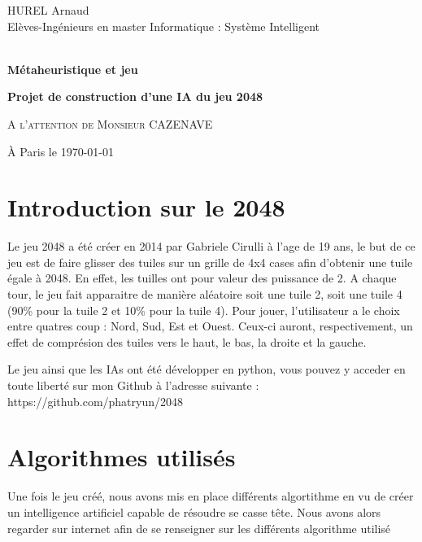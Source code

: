 \documentclass[11pt,a4paper]{article}
\begin{document}
\begin{center}
HUREL Arnaud\\
Elèves-Ingénieurs en master Informatique : Système Intelligent      
\vspace{3cm}



{\textbf{\Huge{\\Métaheuristique et jeu\\}}}
\vspace{1cm}


{\textbf{\Large{Projet de construction d'une IA du jeu 2048\\}}}
\vspace{4cm}

\textsc{{\large{A l'attention de Monsieur CAZENAVE\\}}}


\vspace{4cm}
À Paris le \today
\end{center}
\newpage

\tableofcontents
\newpage

\section{Introduction sur le 2048}
Le jeu 2048 a été créer en 2014 par Gabriele Cirulli à l'age de 19 ans, le but de ce jeu est de faire glisser des tuiles sur un grille de 4x4 cases afin d'obtenir une tuile égale à 2048. En effet, les tuilles ont pour valeur des puissance de 2. A chaque tour, le jeu fait apparaitre de manière aléatoire soit une tuile 2, soit une tuile 4 (90\% pour la tuile 2 et 10\% pour la tuile 4). Pour jouer, l'utilisateur a le choix entre quatres coup : Nord, Sud, Est et Ouest. Ceux-ci auront, respectivement, un effet de comprésion des tuiles vers le haut, le bas, la droite et la gauche.

Le jeu ainsi que les IAs ont été développer en python, vous pouvez y acceder en toute liberté sur mon Github à l'adresse suivante : https://github.com/phatryun/2048


\section{Algorithmes utilisés}
Une fois le jeu créé, nous avons mis en place différents algortithme en vu de créer un intelligence artificiel capable de résoudre se casse tête. Nous avons alors regarder sur internet afin de se renseigner sur les différents algorithme utilisé
\end{document}
